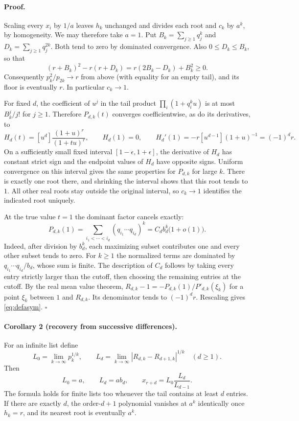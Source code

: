 \documentclass[11pt]{article}
\begin{document}
\paragraph{Proof.}
Scaling every $x_i$ by $1/a$ leaves $h_k$ unchanged and divides each root and
$c_k$ by $a^k$, by homogeneity. We may therefore take $a=1$. Put
$B_k=\sum_{j\ge1}q_j^k$ and $D_k=\sum_{j\ge1}q_j^{2k}$. Both tend to zero
by dominated convergence. Also $0\le D_k\le B_k$, so that
\[
       (r+B_k)^2-r(r+D_k)=r(2B_k-D_k)+B_k^2\ge0.
\]
Consequently $p_k^2/p_{2k}\to r$ from above (with equality for an empty tail),
and its floor is eventually $r$. In particular $c_k\to1$.

For fixed $d$, the coefficient of $u^j$ in the tail product
$\prod_i(1+q_i^k u)$ is at most $B_k^j/j!$ for $j\ge1$. Therefore
$P_{d,k}(t)$ converges coefficientwise, as do its derivatives, to
\[
 H_d(t)=[u^d]\frac{(1+u)^r}{(1+tu)^r},\qquad
 H_d(1)=0,\qquad H_d'(1)=-r[u^{d-1}](1+u)^{-1}=(-1)^d r.
\]
On a sufficiently small fixed interval $[1-\epsilon,1+\epsilon]$, the derivative
of $H_d$ has constant strict sign and the endpoint values of $H_d$ have
opposite signs. Uniform convergence on this interval gives the same properties
for $P_{d,k}$ for large $k$. There is exactly one root there, and shrinking the
interval shows that this root tends to $1$. All other real roots stay outside
the original interval, so $c_k\to1$ identifies the indicated root uniquely.

At the true value $t=1$ the dominant factor cancels exactly:
\[
 P_{d,k}(1)=
 \sum_{i_1<\cdots<i_d}(q_{i_1}\cdots q_{i_d})^k
          = C_d b_d^k\bigl(1+o(1)\bigr).
\]
Indeed, after division by $b_d^k$, each maximizing subset contributes one and
every other subset tends to zero. For $k\ge1$ the normalized terms are
dominated by $q_{i_1}\cdots q_{i_d}/b_d$, whose sum is finite. The
description of $C_d$ follows by taking every entry strictly larger than the
cutoff, then choosing the remaining entries at the cutoff.
By the real mean value theorem,
$R_{d,k}-1=-P_{d,k}(1)/P'_{d,k}(\xi_k)$ for a point $\xi_k$ between
$1$ and $R_{d,k}$. Its denominator tends to $(-1)^d r$.
Rescaling gives \eqref{eq:defasym}. \hfill$\square$

\paragraph{Corollary 2 (recovery from successive differences).}
For an infinite list define
\[
 L_0=\lim_{k\to\infty}p_k^{1/k},\qquad
 L_d=\lim_{k\to\infty}|R_{d,k}-R_{d+1,k}|^{1/k}\quad(d\ge1).
\]
Then
\begin{equation}\label{eq:defrecover}
   L_0=a,\qquad L_d=a b_d,\qquad x_{r+d}=L_0\frac{L_d}{L_{d-1}}.
\end{equation}
The formula holds for finite lists too whenever the tail contains at least
$d$ entries. If there are exactly $d$, the order-$d+1$ polynomial vanishes
at $a^k$ identically once $h_k=r$, and its nearest root is eventually $a^k$.
\end{document}
